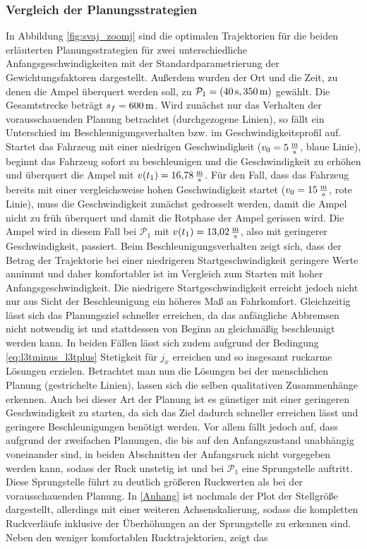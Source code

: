 \subsubsection{Vergleich der Planungsstrategien}\label{subsubsec:Vergleich}
In Abbildung \ref{fig:svaj_zoomj} sind die optimalen Trajektorien für die beiden erläuterten Planungsstrategien für zwei unterschiedliche Anfangsgeschwindigkeiten mit der Standardparametrierung der Gewichtungsfaktoren dargestellt. Außerdem wurden der Ort und die Zeit, zu denen die Ampel überquert werden soll, zu $\mathcal{P}_1 = (40\,\mathrm{s}, 350\,\mathrm{m})$ gewählt. Die Gesamtstrecke beträgt $s_f = 600\,\mathrm{m}$. Wird zunächst nur das Verhalten der vorausschauenden Planung betrachtet (durchgezogene Linien), so fällt ein Unterschied im Beschleunigungsverhalten bzw. im Geschwindigkeitsprofil auf. Startet das Fahrzeug mit einer niedrigen Geschwindigkeit ($v_0 = 5\,\mathrm{\frac{\mathrm{m}}{\mathrm{s}}}$, blaue Linie), beginnt das Fahrzeug sofort zu beschleunigen und die Geschwindigkeit zu erhöhen und überquert die Ampel mit $v(t_1) = 16{,}78\,\mathrm{\frac{\mathrm{m}}{\mathrm{s}}}$. Für den Fall, dass das Fahrzeug bereits mit einer vergleichsweise hohen Geschwindigkeit startet ($v_0 = 15\,\mathrm{\frac{\mathrm{m}}{\mathrm{s}}}$, rote Linie), muss die Geschwindigkeit zunächst gedrosselt werden, damit die Ampel nicht zu früh überquert und damit die Rotphase der Ampel gerissen wird. Die Ampel wird in diesem Fall bei $\mathcal{P}_1$ mit $v(t_1) = 13{,}02\,\mathrm{\frac{\mathrm{m}}{\mathrm{s}}}$, also mit geringerer Geschwindigkeit, passiert. Beim Beschleunigungsverhalten zeigt sich, dass der Betrag der Trajektorie bei einer niedrigeren Startgeschwindigkeit geringere Werte annimmt und daher komfortabler ist im Vergleich zum Starten mit hoher Anfangsgeschwindigkeit. Die niedrigere Startgeschwindigkeit erreicht jedoch nicht nur aus Sicht der Beschleunigung ein höheres Maß an Fahrkomfort. Gleichzeitig lässt sich das Planungsziel schneller erreichen, da das anfängliche Abbremsen nicht notwendig ist und stattdessen von Beginn an gleichmäßig beschleunigt werden kann. In beiden Fällen lässt sich zudem aufgrund der Bedingung \eqref{eq:l3tminus_l3tplus} Stetigkeit für $j_x$ erreichen und so insgesamt ruckarme Lösungen erzielen. Betrachtet man nun die Lösungen bei der menschlichen Planung (gestrichelte Linien), lassen sich die selben qualitativen Zusammenhänge erkennen. Auch bei dieser Art der Planung ist es günstiger mit einer geringeren Geschwindigkeit zu starten, da sich das Ziel dadurch schneller erreichen lässt und geringere Beschleunigungen benötigt werden. Vor allem fällt jedoch auf, dass aufgrund der zweifachen Planungen, die bis auf den Anfangszustand unabhängig voneinander sind, in beiden Abschnitten der Anfangsruck nicht vorgegeben werden kann, sodass der Ruck unstetig ist und bei $\mathcal{P}_1$ eine Sprungstelle auftritt. Diese Sprungstelle führt zu deutlich größeren Ruckwerten als bei der vorausschauenden Planung. In \ref{Anhang} ist nochmals der Plot der Stellgröße dargestellt, allerdings mit einer weiteren Achsenskalierung, sodass die kompletten Ruckverläufe inklusive der Überhöhungen an der Sprungstelle zu erkennen sind. Neben den weniger komfortablen Rucktrajektorien, zeigt das 